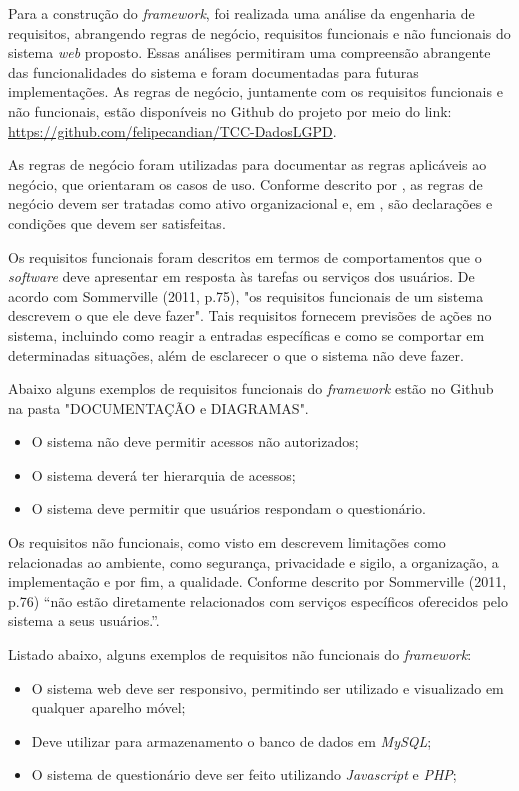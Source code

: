 \documentclass[
	12pt,				%
	openright,			%
	oneside,			%
	a4paper,			%
	english,			%
	french,				%
	spanish,			%
	brazil,				%
	]{abntex2}
\begin{document}
Para a construção do \textit{framework}, foi realizada uma análise da engenharia de requisitos, abrangendo regras de negócio, requisitos funcionais e não funcionais do sistema \textit{web} proposto. Essas análises permitiram uma compreensão abrangente das funcionalidades do sistema e foram documentadas para futuras implementações. As regras de negócio, juntamente com os requisitos funcionais e não funcionais, estão disponíveis no Github do projeto por meio do link: \url{https://github.com/felipecandian/TCC-DadosLGPD}.

As regras de negócio foram utilizadas para documentar as regras aplicáveis ao negócio, que orientaram os casos de uso. Conforme descrito por , as regras de negócio devem ser tratadas como ativo organizacional e, em \cite{Wazlawick2013}, são declarações e condições que devem ser satisfeitas.

Os requisitos funcionais foram descritos em termos de comportamentos que o \textit{software} deve apresentar em resposta às tarefas ou serviços dos usuários. De acordo com Sommerville (2011, p.75), "os requisitos funcionais de um sistema descrevem o que ele deve fazer". Tais requisitos fornecem previsões de ações no sistema, incluindo como reagir a entradas específicas e como se comportar em determinadas situações, além de esclarecer o que o sistema não deve fazer.


Abaixo alguns exemplos de requisitos funcionais do \textit{framework} estão no Github na pasta "DOCUMENTAÇÃO e DIAGRAMAS".
\begin{itemize}
\item O sistema não deve permitir acessos não autorizados;
\item O sistema deverá ter hierarquia de acessos;
\item O sistema deve permitir que usuários respondam o questionário.
\end{itemize}

Os requisitos não funcionais, como visto em  descrevem limitações como relacionadas ao ambiente, como segurança, privacidade e sigilo, a organização, a implementação e por fim, a qualidade. Conforme descrito por Sommerville (2011, p.76) “não estão diretamente relacionados com serviços específicos oferecidos pelo sistema a seus usuários.”. 

Listado abaixo, alguns exemplos de requisitos não funcionais do \textit{framework}:

\begin{itemize}
\item O sistema web deve ser responsivo, permitindo ser utilizado e visualizado em qualquer aparelho móvel;
\item Deve utilizar para armazenamento o banco de dados em \textit{MySQL};
\item O sistema de questionário deve ser feito utilizando \textit{Javascript} e \textit{PHP};
\end{itemize}
\end{document}
